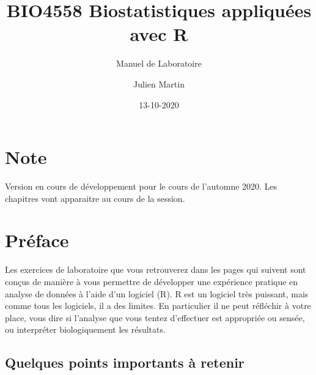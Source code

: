 \documentclass[12pt,]{book}
\title{BIO4558 Biostatistiques appliquées avec R}
\subtitle{Manuel de Laboratoire}
\author{Julien Martin}
\date{13-10-2020}
\begin{document}
\maketitle



{
\setcounter{tocdepth}{1}
\tableofcontents
}
\hypertarget{note}{%
\chapter*{Note}\label{note}}

Version en cours de développement pour le cours de l'automne 2020. Les chapitres vont apparaitre au cours de la session.

\hypertarget{pruxe9face}{%
\chapter*{Préface}\label{pruxe9face}}

Les exercices de laboratoire que vous retrouverez dans les pages qui suivent sont conçus de manière à vous permettre de développer une expérience pratique en analyse de données à l'aide d'un logiciel (R).
R est un logiciel très puissant, mais comme tous les logiciels, il a des limites.
En particulier il ne peut réfléchir à votre place, vous dire si l'analyse que vous tentez d'effectuer est appropriée ou sensée, ou interpréter biologiquement les résultats.

\hypertarget{quelques-points-importants-uxe0-retenir}{%
\section*{Quelques points importants à retenir}\label{quelques-points-importants-uxe0-retenir}}
\end{document}
